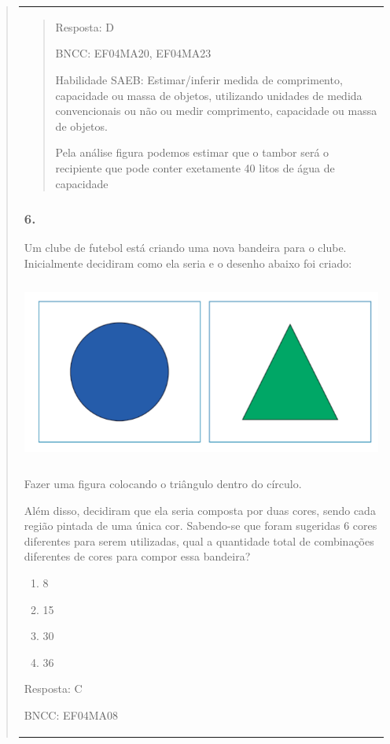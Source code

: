 \begin{enumerate}
\begin{escolha}
\begin{enumerate}
\begin{itemize}
\begin{itemize}
\begin{escolha}
\begin{quote}
\begin{escolha}
{\begin{longtable}[]{@{}l@{}}
\begin{itemize}
\begin{quote}
Resposta: D

BNCC: EF04MA20, EF04MA23

Habilidade SAEB: Estimar/inferir medida de comprimento, capacidade ou
massa de objetos, utilizando unidades de medida convencionais ou não ou
medir comprimento, capacidade ou massa de objetos.

Pela análise figura podemos estimar que o tambor será o recipiente que
pode conter exetamente 40 litos de água de capacidade
\end{quote}

\subsubsection{6. }\label{section-192}

Um clube de futebol está criando uma nova bandeira para o clube.
Inicialmente decidiram como ela seria e o desenho abaixo foi criado:

\includegraphics[width=5.26712in,height=2.37521in]{media/image167.png}

Fazer uma figura colocando o triângulo dentro do círculo.

Além disso, decidiram que ela seria composta por duas cores, sendo cada
região pintada de uma única cor. Sabendo-se que foram sugeridas 6 cores
diferentes para serem utilizadas, qual a quantidade total de combinações
diferentes de cores para compor essa bandeira?

\begin{enumerate}
\def\labelenumi{\alph{enumi})}
\item
  8
\item
  15
\item
  30
\item
  36
\end{enumerate}

Resposta: C

BNCC: EF04MA08


\end{itemize}
\end{longtable}}
\end{escolha}
\end{quote}
\end{escolha}
\end{itemize}
\end{itemize}
\end{enumerate}
\end{escolha}
\end{enumerate}
